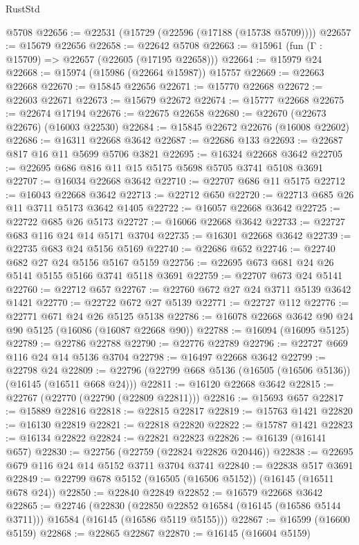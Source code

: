 \begin{lexlean}{RustStd}
\begin{coremodule}
    @5708
@22656 := @22531 (@15729 (@22596 (@17188 (@15738 @5709))))
@22657 := @15679 @22656
@22658 := @22642 @5708
@22663 := @15961 (fun (Γ : @15709) => @22657 (@22605 (@17195 @22658)))
@22664 := @15979 @24
@22668 := @15974 (@15986 (@22664 @15987)) @15757
@22669 := @22663 @22668
@22670 := @15845 @22656
@22671 := @15770 @22668
@22672 := @22603 @22671
@22673 := @15679 @22672
@22674 := @15777 @22668
@22675 := @22674 @17194
@22676 := @22675 @22658
@22680 := @22670 (@22673 @22676) (@16003 @22530)
@22684 := @15845 @22672 @22676 (@16008 @22602)
@22686 := @16311 @22668 @3642
@22687 := @22686 @133
@22693 := @22687 @817 @16 @11 @5699 @5706 @3821
@22695 := @16324 @22668 @3642
@22705 := @22695 @686 @816 @11 @15 @5175 @5698 @5705 @3741 @5108 @3691
@22707 := @16034 @22668 @3642
@22710 := @22707 @686 @11 @5175
@22712 := @16043 @22668 @3642
@22713 := @22712 @650
@22720 := @22713 @685 @26 @11 @3711 @5173 @3642 @1405
@22722 := @16057 @22668 @3642
@22725 := @22722 @685 @26 @5173
@22727 := @16066 @22668 @3642
@22733 := @22727 @683 @116 @24 @14 @5171 @3704
@22735 := @16301 @22668 @3642
@22739 := @22735 @683 @24 @5156 @5169
@22740 := @22686 @652
@22746 := @22740 @682 @27 @24 @5156 @5167 @5159
@22756 := @22695 @673 @681 @24 @26 @5141 @5155 @5166 @3741 @5118 @3691
@22759 := @22707 @673 @24 @5141
@22760 := @22712 @657
@22767 := @22760 @672 @27 @24 @3711 @5139 @3642 @1421
@22770 := @22722 @672 @27 @5139
@22771 := @22727 @112
@22776 := @22771 @671 @24 @26 @5125 @5138
@22786 := @16078 @22668 @3642 @90 @24 @90 @5125 (@16086 (@16087 @22668 @90))
@22788 := @16094 (@16095 @5125)
@22789 := @22786 @22788
@22790 := @22776 @22789
@22796 := @22727 @669 @116 @24 @14 @5136 @3704
@22798 := @16497 @22668 @3642
@22799 := @22798 @24
@22809 := @22796 (@22799 @668 @5136 (@16505 (@16506 @5136)) (@16145 (@16511 @668 @24)))
@22811 := @16120 @22668 @3642
@22815 := @22767 (@22770 (@22790 (@22809 @22811)))
@22816 := @15693 @657
@22817 := @15889 @22816
@22818 := @22815 @22817
@22819 := @15763 @1421
@22820 := @16130 @22819
@22821 := @22818 @22820
@22822 := @15787 @1421
@22823 := @16134 @22822
@22824 := @22821 @22823
@22826 := @16139 (@16141 @657)
@22830 := @22756 (@22759 (@22824 @22826 @20446))
@22838 := @22695 @679 @116 @24 @14 @5152 @3711 @3704 @3741
@22840 := @22838 @517 @3691
@22849 := @22799 @678 @5152 (@16505 (@16506 @5152)) (@16145 (@16511 @678 @24))
@22850 := @22840 @22849
@22852 := @16579 @22668 @3642
@22865 := @22746
    (@22830
      (@22850 @22852 @16584 (@16145 (@16586 @5144 @3711)))
      @16584
      (@16145 (@16586 @5119 @5155)))
@22867 := @16599 (@16600 @5159)
@22868 := @22865 @22867
@22870 := @16145 (@16604 @5159)

\end{coremodule}
\end{lexlean}
